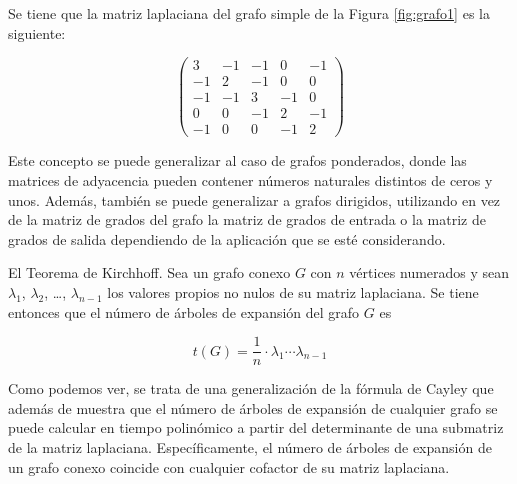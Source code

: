 \begin{exampleth}
Se tiene que la matriz laplaciana del grafo simple de la Figura \ref{fig:grafo1} es la siguiente:

\begin{equation}
\begin{pmatrix}
3 & -1 & -1 & 0 & -1\\
-1 & 2 & -1 & 0 & 0\\
-1 & -1 & 3 & -1 & 0\\
0 & 0 & -1 & 2 & -1\\
-1 & 0 & 0 & -1 & 2
\end{pmatrix}
\end{equation}
\end{exampleth}

Este concepto se puede generalizar al caso de grafos ponderados, donde las matrices de adyacencia pueden contener números naturales distintos de ceros y unos. Además, también se puede generalizar a grafos dirigidos, utilizando en vez de la matriz de grados del grafo la matriz de grados de entrada o la matriz de grados de salida dependiendo de la aplicación que se esté considerando.

\begin{exampleth}
\end{exampleth}

\begin{theorem}
El Teorema de Kirchhoff. Sea un grafo conexo $G$ con $n$ vértices numerados y sean $\lambda_1$, $\lambda_2$, \dots, $\lambda_{n-1}$ los valores propios no nulos de su matriz laplaciana. Se tiene entonces que el número de árboles de expansión del grafo $G$ es

\begin{equation}
t(G) = \frac{1}{n} \cdot \lambda_1 \cdots \lambda_{n-1}
\end{equation}

Como podemos ver, se trata de una generalización de la fórmula de Cayley que además de muestra que el número de árboles de expansión de cualquier grafo se puede calcular en tiempo polinómico a partir del determinante de una submatriz de la matriz laplaciana. Específicamente, el número de árboles de expansión de un grafo conexo coincide con cualquier cofactor de su matriz laplaciana.
\end{theorem}